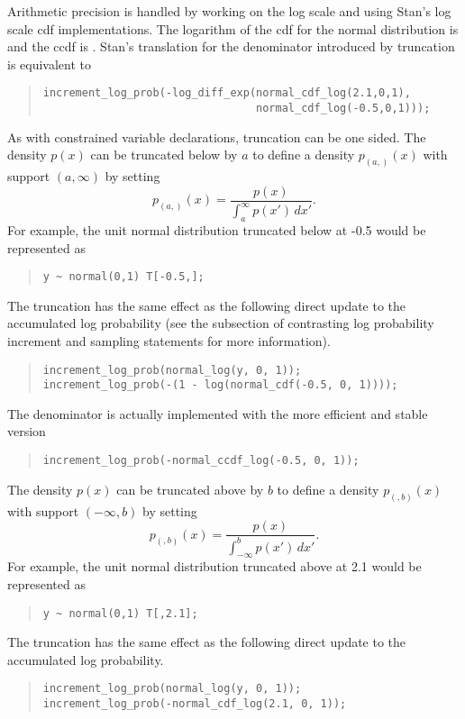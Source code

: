 Arithmetic precision is handled by working on the log scale and using
Stan's log scale cdf implementations.  The logarithm of the cdf for
the normal distribution is  and the ccdf is
.  Stan's translation for the denominator
introduced by truncation is equivalent to
%
\begin{quote}
\begin{Verbatim}
increment_log_prob(-log_diff_exp(normal_cdf_log(2.1,0,1),
                                 normal_cdf_log(-0.5,0,1)));
\end{Verbatim}
\end{quote}
%

As with constrained variable declarations, truncation can be one
sided.  The density $p(x)$ can be truncated below by $a$ to define a
density $p_{(a,)}(x)$ with support $(a,\infty)$ by setting
%
\[
p_{(a,)}(x) = \frac{p(x)}
                 {\int_a^{\infty} p(x') \, dx'}.
\]
For example, the unit normal distribution truncated below at -0.5 would
be represented as
%
\begin{quote}
\begin{Verbatim} 
y ~ normal(0,1) T[-0.5,];
\end{Verbatim}
\end{quote}
% 
The truncation has the same effect as the following direct update to
the accumulated log probability (see the subsection of
 contrasting log probability increment
and sampling statements for more information).
%
\begin{quote}
\begin{Verbatim}
increment_log_prob(normal_log(y, 0, 1));
increment_log_prob(-(1 - log(normal_cdf(-0.5, 0, 1))));
\end{Verbatim}
\end{quote}
%
The denominator is actually implemented with the more efficient and
stable version
%
\begin{quote}
\begin{Verbatim}
increment_log_prob(-normal_ccdf_log(-0.5, 0, 1));
\end{Verbatim}
\end{quote}

The density $p(x)$ can be truncated above by $b$ to define a density
$p_{(,b)}(x)$ with support $(-\infty,b)$ by setting
\[
p_{(,b)}(x) = \frac{p(x)}
                    {\int_{-\infty}^b p(x') \, dx'}.
\]
For example, the unit normal distribution truncated above at 2.1 would
be represented as
%
\begin{quote}
\begin{Verbatim} 
y ~ normal(0,1) T[,2.1];
\end{Verbatim}
\end{quote}
% 
The truncation has the same effect as the following direct update to
the accumulated log probability.
%
\begin{quote}
\begin{Verbatim}
increment_log_prob(normal_log(y, 0, 1));
increment_log_prob(-normal_cdf_log(2.1, 0, 1));
\end{Verbatim}
\end{quote}

